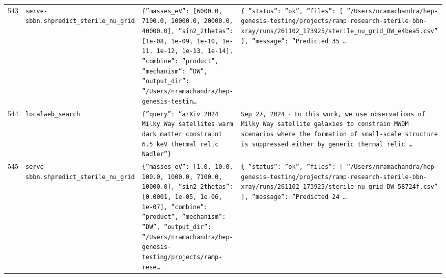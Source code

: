 \documentclass[11pt,a4paper]{article}
\begin{document}
\begin{longtable}{@{}p{}p{}p{}p{}@{}}
543 & \texttt{serve-sbbn.sh}\newline\texttt{predict\_\allowbreak{}sterile\_\allowbreak{}nu\_\allowbreak{}grid} & \texttt{\{''masses\_\allowbreak{}eV'':\allowbreak{} [6000.0,\allowbreak{} 7100.0,\allowbreak{} 10000.0,\allowbreak{} 20000.0,\allowbreak{} 40000.0]\allowbreak{},\allowbreak{} ''sin2\_\allowbreak{}2thetas'':\allowbreak{} [1e-08,\allowbreak{} 1e-09,\allowbreak{} 1e-10,\allowbreak{} 1e-11,\allowbreak{} 1e-12,\allowbreak{} 1e-13,\allowbreak{} 1e-14]\allowbreak{},\allowbreak{} ''combine'':\allowbreak{} ''product'',\allowbreak{} ''mechanism'':\allowbreak{} ''DW'',\allowbreak{} ''output\_\allowbreak{}dir'':\allowbreak{} ''/\allowbreak{}Users/\allowbreak{}nramachandra/\allowbreak{}hep-genesis-testin\ldots{}\allowbreak{}} & \texttt{\{   ''status'':\allowbreak{} ''ok'',\allowbreak{}   ''files'':\allowbreak{} [     ''/\allowbreak{}Users/\allowbreak{}nramachandra/\allowbreak{}hep-genesis-testing/\allowbreak{}projects/\allowbreak{}ramp-research-sterile-bbn-xray/\allowbreak{}runs/\allowbreak{}261102\_\allowbreak{}173925/\allowbreak{}sterile\_\allowbreak{}nu\_\allowbreak{}grid\_\allowbreak{}DW\_\allowbreak{}e4bea5.csv''   ]\allowbreak{},\allowbreak{}   ''message'':\allowbreak{} ''Predicted 35 \ldots{}\allowbreak{}} \\
544 & \texttt{local}\newline\texttt{web\_\allowbreak{}search} & \texttt{\{''query'':\allowbreak{} ''arXiv 2024 Milky Way satellites warm dark matter constraint 6.5 keV thermal relic Nadler''\}\allowbreak{}} & \texttt{Sep 27,\allowbreak{} 2024 $\cdot$ In this work,\allowbreak{} we use observations of Milky Way satellite galaxies to constrain MWDM scenarios where the formation of small-scale structure is suppressed either by generic thermal relic \ldots{}\allowbreak{}} \\
545 & \texttt{serve-sbbn.sh}\newline\texttt{predict\_\allowbreak{}sterile\_\allowbreak{}nu\_\allowbreak{}grid} & \texttt{\{''masses\_\allowbreak{}eV'':\allowbreak{} [1.0,\allowbreak{} 10.0,\allowbreak{} 100.0,\allowbreak{} 1000.0,\allowbreak{} 7100.0,\allowbreak{} 10000.0]\allowbreak{},\allowbreak{} ''sin2\_\allowbreak{}2thetas'':\allowbreak{} [0.0001,\allowbreak{} 1e-05,\allowbreak{} 1e-06,\allowbreak{} 1e-07]\allowbreak{},\allowbreak{} ''combine'':\allowbreak{} ''product'',\allowbreak{} ''mechanism'':\allowbreak{} ''DW'',\allowbreak{} ''output\_\allowbreak{}dir'':\allowbreak{} ''/\allowbreak{}Users/\allowbreak{}nramachandra/\allowbreak{}hep-genesis-testing/\allowbreak{}projects/\allowbreak{}ramp-rese\ldots{}\allowbreak{}} & \texttt{\{   ''status'':\allowbreak{} ''ok'',\allowbreak{}   ''files'':\allowbreak{} [     ''/\allowbreak{}Users/\allowbreak{}nramachandra/\allowbreak{}hep-genesis-testing/\allowbreak{}projects/\allowbreak{}ramp-research-sterile-bbn-xray/\allowbreak{}runs/\allowbreak{}261102\_\allowbreak{}173925/\allowbreak{}sterile\_\allowbreak{}nu\_\allowbreak{}grid\_\allowbreak{}DW\_\allowbreak{}58724f.csv''   ]\allowbreak{},\allowbreak{}   ''message'':\allowbreak{} ''Predicted 24 \ldots{}\allowbreak{}} \\

\end{longtable}
\end{document}
